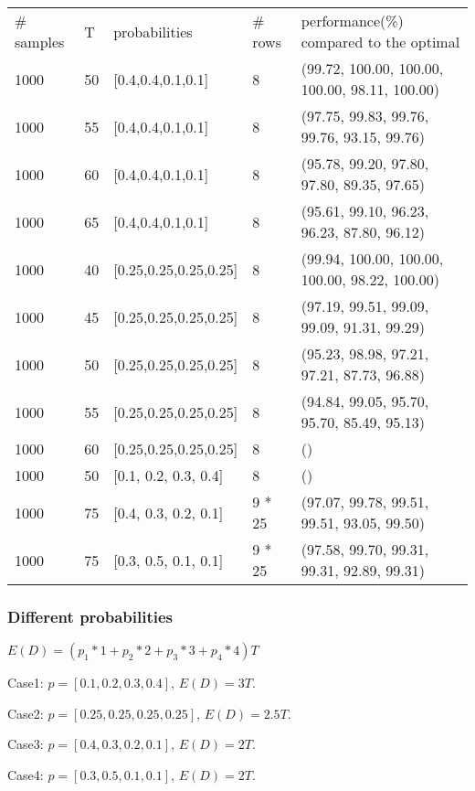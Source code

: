 \begin{table}[ht]
  \begin{tabular}{l|l|l|l|l}
  \hline
  \# samples & T & probabilities & \# rows & performance(\%) compared to the optimal \\
  1000  & 50  & [0.4,0.4,0.1,0.1] & 8 & (99.72, 100.00, 100.00, 100.00, 98.11, 100.00) \\
  1000  & 55  & [0.4,0.4,0.1,0.1] & 8 & (97.75, 99.83, 99.76, 99.76, 93.15, 99.76) \\ %
  1000  & 60  & [0.4,0.4,0.1,0.1] & 8 & (95.78, 99.20, 97.80, 97.80, 89.35, 97.65) \\
  1000  & 65  & [0.4,0.4,0.1,0.1] & 8 & (95.61, 99.10, 96.23, 96.23, 87.80, 96.12) \\
  \hline
  1000  & 40  & [0.25,0.25,0.25,0.25] & 8 & (99.94, 100.00, 100.00, 100.00, 98.22, 100.00) \\
  1000  & 45  & [0.25,0.25,0.25,0.25] & 8 & (97.19, 99.51, 99.09, 99.09, 91.31, 99.29) \\
  1000  & 50  & [0.25,0.25,0.25,0.25] & 8 & (95.23, 98.98, 97.21, 97.21, 87.73, 96.88) \\
  1000  & 55  & [0.25,0.25,0.25,0.25] & 8 & (94.84, 99.05, 95.70, 95.70, 85.49, 95.13) \\
  \hline
  1000  & 60  & [0.25,0.25,0.25,0.25] & 8 & () \\
  1000  & 50  & [0.1, 0.2, 0.3, 0.4] & 8 & () \\
  1000  & 75  & [0.4, 0.3, 0.2, 0.1] & 9 * 25 & (97.07, 99.78, 99.51, 99.51, 93.05, 99.50) \\
  1000  & 75  & [0.3, 0.5, 0.1, 0.1] & 9 * 25 & (97.58, 99.70, 99.31, 99.31, 92.89, 99.31) \\
  \end{tabular}
\end{table}

\subsubsection{Different probabilities}

$E(D) = (p_1 * 1 + p_2 * 2 + p_3 * 3 + p_4 * 4) T$

Case1: $p = [0.1, 0.2, 0.3, 0.4]$, $E(D) = 3T$.

Case2: $p = [0.25, 0.25, 0.25, 0.25]$, $E(D) = 2.5 T$.

Case3: $p = [0.4, 0.3, 0.2, 0.1]$, $E(D) = 2 T$.

Case4: $p = [0.3, 0.5, 0.1, 0.1]$, $E(D) = 2 T$.

